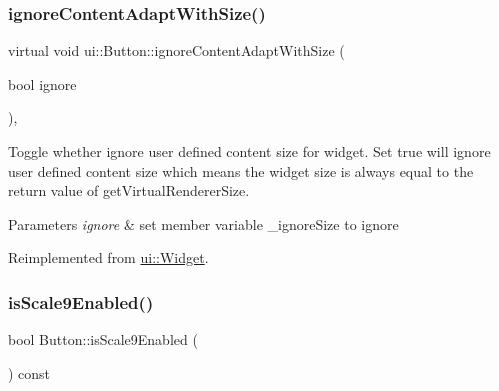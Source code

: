 \mbox{\label{classui_1_1Button_ad7f80b2facb4b54b8c65fc17dbb7ddda}} 
\subsubsection{\texorpdfstring{ignore\+Content\+Adapt\+With\+Size()}{ignoreContentAdaptWithSize()}\hspace{0.1cm}{\footnotesize\ttfamily [2/2]}}
{\footnotesize\ttfamily virtual void ui\+::\+Button\+::ignore\+Content\+Adapt\+With\+Size (\begin{DoxyParamCaption}\item[{bool}]{ignore }\end{DoxyParamCaption})\hspace{0.3cm}{\ttfamily [override]}, {\ttfamily [virtual]}}

Toggle whether ignore user defined content size for widget. Set true will ignore user defined content size which means the widget size is always equal to the return value of {\ttfamily get\+Virtual\+Renderer\+Size}.


\begin{DoxyParams}{Parameters}
{\em ignore} & set member variable \+\_\+ignore\+Size to ignore \\
\hline
\end{DoxyParams}


Reimplemented from \hyperlink{classui_1_1Widget_a47ec556e48f2ac20290c197e30434d36}{ui\+::\+Widget}.

\mbox{\label{classui_1_1Button_a272772f1ca027ea7e228580d1dc9b195}} 
\subsubsection{\texorpdfstring{is\+Scale9\+Enabled()}{isScale9Enabled()}\hspace{0.1cm}{\footnotesize\ttfamily [1/2]}}
{\footnotesize\ttfamily bool Button\+::is\+Scale9\+Enabled (\begin{DoxyParamCaption}{ }\end{DoxyParamCaption}) const}

